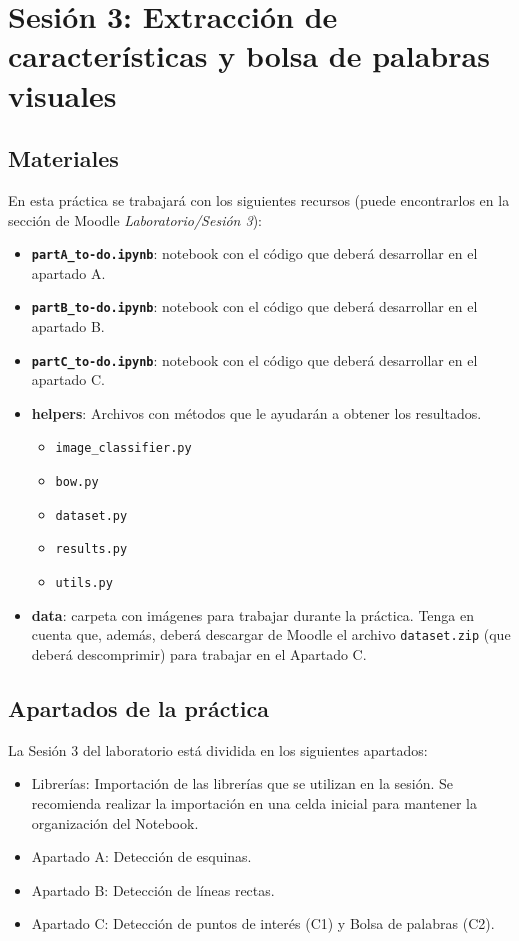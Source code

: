 \chapter{Sesión 3: Extracción de características y bolsa de palabras visuales}
\label{chapter:introduction_ses_3}

\section{Materiales}

En esta práctica se trabajará con los siguientes recursos (puede encontrarlos en la sección de Moodle \textit{Laboratorio/Sesión 3}):

\begin{itemize}
    \item \textbf{\texttt{partA\_to-do.ipynb}}: notebook con el código que deberá desarrollar en el apartado A.
    \item \textbf{\texttt{partB\_to-do.ipynb}}: notebook con el código que deberá desarrollar en el apartado B.
    \item \textbf{\texttt{partC\_to-do.ipynb}}: notebook con el código que deberá desarrollar en el apartado C.
    \item \textbf{helpers}: Archivos con métodos que le ayudarán a obtener los resultados. 
    \begin{itemize}
        \item \texttt{image\_classifier.py}
        \item \texttt{bow.py}
        \item \texttt{dataset.py}
        \item \texttt{results.py}
        \item \texttt{utils.py}
    \end{itemize}
    \item \textbf{data}: carpeta con imágenes para trabajar durante la práctica. Tenga en cuenta que, además, deberá descargar de Moodle el archivo \texttt{dataset.zip} (que deberá descomprimir) para trabajar en el Apartado C.
\end{itemize}

\section{Apartados de la práctica}

La Sesión 3 del laboratorio está dividida en los siguientes apartados:

\begin{itemize}
    \item Librerías: Importación de las librerías que se utilizan en la sesión. Se recomienda realizar la importación en una celda inicial para mantener la organización del Notebook.
    \item Apartado A: Detección de esquinas.
    \item Apartado B: Detección de líneas rectas.
    \item Apartado C: Detección de puntos de interés (C1) y Bolsa de palabras (C2).
\end{itemize}

